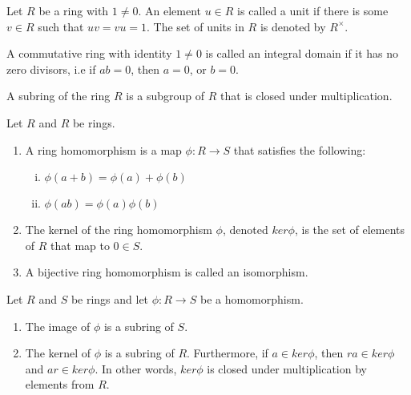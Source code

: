 \begin{defn}[Unit]
  Let $R$ be a ring with $1 \neq 0$. An element $u \in R$ is called a unit if
  there is some $v \in R$ such that $uv=vu=1$. The set of units in $R$ is
  denoted by $R^\times$.
\end{defn}


\begin{defn}
  A commutative ring with identity $1 \neq 0$ is called an integral domain if it
  has no zero divisors, i.e if $ab=0$, then $a=0$, or $b=0$.
\end{defn}


\begin{defn}[Subring]
  A subring of the ring $R$ is a subgroup of $R$ that is closed under
  multiplication.
\end{defn}


\begin{defn}
  Let $R$ and $R$ be rings. 
  \begin{enumerate}
    \item A ring homomorphism is a map $\phi: R \rightarrow S$ that satisfies
    the following:
    \begin{enumerate}[(i)]
      \item $\phi(a+b) = \phi(a) + \phi(b)$
      \item $\phi(ab) = \phi(a) \phi(b)$
    \end{enumerate}
    
    \item The kernel of the ring homomorphism $\phi$, denoted $ker\phi$, is the
    set of elements of $R$ that map to $0 \in S$.
    \item A bijective ring homomorphism is called an isomorphism.
  \end{enumerate}  
\end{defn}


\begin{prop}
  Let $R$ and $S$ be rings and let $\phi: R \rightarrow S$ be a homomorphism.
  \begin{enumerate}
    \item The image of $\phi$ is a subring of $S$.
    \item The kernel of $\phi$ is a subring of $R$. Furthermore, if 
    $a \in ker\phi$, then $ra \in ker\phi$ and $ar \in ker\phi$. In other words,
    $ker\phi$ is closed under multiplication by elements from $R$.
  \end{enumerate}
\end{prop}


